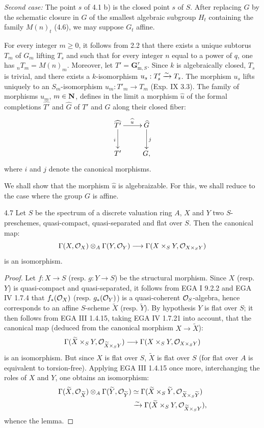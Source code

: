\noindent\emph{Second case:} The point $s$ of 4.1 b) is the closed point $s$ of $S$. After replacing $G$ by the schematic closure in $G$ of the smallest algebraic subgroup $H_t$ containing the family $M(n)_t$ (4.6), we may suppose $G_t$ affine.

For every integer $m\geq0$, it follows from 2.2 that there exists a unique subtorus $T_m$ of $G_m$ lifting $T_s$ and such that for every integer $n$ equal to a power of $q$, one has ${}_nT_m=M(n)_m$. Moreover, let $T'=\mathbf G_{\mathrm m,S}^r$. Since $k$ is algebraically closed, $T_s$ is trivial, and there exists a $k$-isomorphism $u_s:T'_s\xrightarrow{\sim} T_s$. The morphism $u_s$ lifts uniquely to an $S_m$-isomorphism $u_m:T'_m\to T_m$ (Exp. IX 3.3). The family of morphisms $u_m$, $m\in\mathbf{N}$, defines in the limit a morphism $\widehat u$ of the formal completions $\widehat{T'}$ and $\widehat G$ of $T'$ and $G$ along their closed fiber:
\[
\xymatrix{\widehat{T'}\ar[r]^{\widehat u}\ar[d]_i&\widehat G\ar[d]^j\\T'&G,}
\]
where $i$ and $j$ denote the canonical morphisms.

We shall show that the morphism $\widehat u$ is algebraizable. For this, we shall reduce to the case where the group $G$ is affine.
\begin{lemma}{4.7}\label{XV.4.7}
Let $S$ be the spectrum of a discrete valuation ring $A$, $X$ and $Y$ two $S$-preschemes, quasi-compact, quasi-separated and flat over $S$. Then the canonical map:
\[
\Gamma(X,\mathcal{O}_X)\otimes_A\Gamma(Y,\mathcal{O}_Y)\longrightarrow\Gamma(X\times_S Y,\mathcal{O}_{X\times_S Y})
\]
is an isomorphism.
\end{lemma}
\begin{proof}
Let $f:X\to S$ (resp. $g:Y\to S$) be the structural morphism. Since $X$ (resp. $Y$) is quasi-compact and quasi-separated, it follows from EGA I 9.2.2 and EGA IV 1.7.4 that $f_*(\mathcal{O}_X)$ (resp. $g_*(\mathcal{O}_Y)$) is a quasi-coherent $\mathcal{O}_S$-algebra, hence corresponds to an affine $S$-scheme $\widetilde X$ (resp. $\widetilde Y$). By hypothesis $Y$ is flat over $S$; it then follows from EGA III 1.4.15, taking EGA IV 1.7.21 into account, that the canonical map (deduced from the canonical morphism $X\to\widetilde X$):
\[
\Gamma(\widetilde X\times_S Y,\mathcal{O}_{\widetilde X\times_S Y})\longrightarrow\Gamma(X\times_S Y,\mathcal{O}_{X\times_S Y})
\]
is an isomorphism. But since $X$ is flat over $S$, $\widetilde X$ is flat over $S$ (for flat over $A$ is equivalent to torsion-free). Applying EGA III 1.4.15 once more, interchanging the roles of $X$ and $Y$, one obtains an isomorphism:
\[
\begin{aligned}
\Gamma(\widetilde X,\mathcal{O}_{\widetilde X})\otimes_A\Gamma(\widetilde Y,\mathcal{O}_{\widetilde Y})
&\simeq\Gamma(\widetilde X\times_S\widetilde Y,\mathcal{O}_{\widetilde X\times_S\widetilde Y})\\
&\xrightarrow{\sim}\Gamma(\widetilde X\times_S Y,\mathcal{O}_{\widetilde X\times_S Y}),
\end{aligned}
\]
whence the lemma.
\end{proof}

